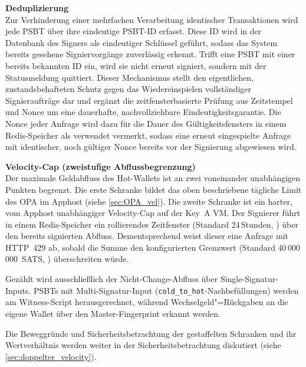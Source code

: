 \textbf{Deduplizierung} \\
Zur Verhinderung einer mehrfachen Verarbeitung identischer Transaktionen wird jede \ac{PSBT} über ihre eindeutige \ac{PSBT}-\ac{ID} erfasst. Diese \ac{ID} wird in der Datenbank des Signers als eindeutiger Schlüssel geführt, sodass das System bereits gesehene Signiervorgänge zuverlässig erkennt. Trifft eine \ac{PSBT} mit einer bereits bekannten \ac{ID} ein, wird sie nicht erneut signiert, sondern mit der Statusmeldung \texttt{} quittiert. Dieser Mechanismus stellt den eigentlichen, zustandsbehafteten Schutz gegen das Wiedereinspielen vollständiger Signieraufträge dar und ergänzt die zeitfensterbasierte Prüfung aus Zeitstempel und Nonce um eine dauerhafte, nachvollziehbare Eindeutigkeitsgarantie. Die Nonce jeder Anfrage wird dazu für die Dauer des Gültigkeitsfensters in einem Redis-Speicher als verwendet vermerkt, sodass eine erneut eingespielte Anfrage mit identischer, noch gültiger Nonce bereits vor der Signierung abgewiesen wird.

\textbf{Velocity-Cap (zweistufige Abflussbegrenzung)} \label{sec:keyA_vel} \\
Der maximale Geldabfluss des Hot-Wallets ist an zwei voneinander unabhängigen Punkten begrenzt. Die erste Schranke bildet das oben beschriebene tägliche Limit des \ac{OPA} im Apphost (siehe \ref{sec:OPA_vel}). Die zweite Schranke ist ein harter, vom Apphost unabhängiger Velocity-Cap auf der Key~A \ac{VM}.
Der Signierer führt in einem Redis-Speicher ein rollierendes Zeitfenster (Standard 24\,Stunden, ) über den bereits signierten Abfluss. Dementsprechend weist dieser eine Anfrage mit \ac{HTTP}~429 ab, sobald die Summe den konfigurierten Grenzwert (Standard 40\,000\,000~\ac{SATS}, ) überschreiten würde.

Gezählt wird ausschließlich der Nicht-Change-Abfluss über Single-Signatur-Inputs.
\acp{PSBT} mit Multi-Signatur-Input (\texttt{cold\_to\_hot}-Nachbefüllungen) werden am Witness-Script herausgerechnet, während Wechselgeld"=Rückgaben an die eigene Wallet über den Master-Fingerprint erkannt werden.

Die Beweggründe und Sicherheitsbetrachtung der gestaffelten Schranken und ihr Wertverhältnis werden weiter in der Sicherheitsbetrachtung diskutiert (siehe \ref{sec:doppelter_velocity}).

